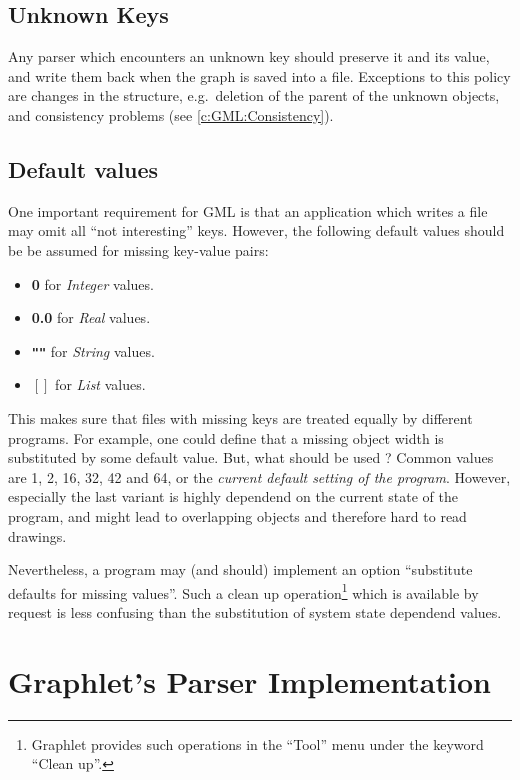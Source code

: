 \subsection{Unknown Keys}
Any parser which encounters an unknown key should preserve it and
its value, and write them back when the graph is saved into a
file.  Exceptions to this policy are changes in the structure,
e.g.\ deletion of the parent of the unknown objects, and
consistency problems (see \ref{c:GML:Consistency}).

\subsection{Default values}

One important requirement for GML is that an application which
writes a file may omit all ``not interesting'' keys. However, the
following default values should be be assumed for missing
key-value pairs:
\begin{itemize}
  \item \textbf{0} for \emph{Integer} values.
  \item \textbf{0.0} for \emph{Real} values.
  \item \textbf{\texttt{""}} for \emph{String} values.
  \item $\left[\right]$ for \emph{List} values.
\end{itemize}

\noindent This makes sure that files with missing keys are treated
equally by different programs. For example, one could define that
a missing object width is substituted by some default value. But,
what should be used ? Common values are 1, 2, 16, 32, 42 and 64,
or the \emph{current default setting of the program}. However,
especially the last variant is highly dependend on the current
state of the program, and might lead to overlapping objects and
therefore hard to read drawings.

Nevertheless, a program may (and should) implement an option
``substitute defaults for missing values''. Such a clean up
operation\footnote{Graphlet provides such operations in the
  ``Tool'' menu under the keyword ``Clean up''.} which is
available by request is less confusing than the substitution of
system state dependend values.


%
%

\section{Graphlet's Parser Implementation}

